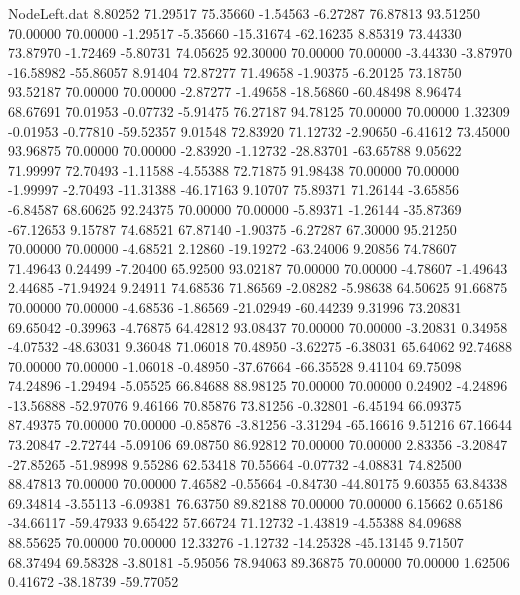 \begin{filecontents}{NodeLeft.dat}
   8.80252   71.29517   75.35660    -1.54563   -6.27287   76.87813   93.51250   70.00000   70.00000   -1.29517   -5.35660  -15.31674  -62.16235
   8.85319   73.44330   73.87970    -1.72469   -5.80731   74.05625   92.30000   70.00000   70.00000   -3.44330   -3.87970  -16.58982  -55.86057
   8.91404   72.87277   71.49658    -1.90375   -6.20125   73.18750   93.52187   70.00000   70.00000   -2.87277   -1.49658  -18.56860  -60.48498
   8.96474   68.67691   70.01953    -0.07732   -5.91475   76.27187   94.78125   70.00000   70.00000    1.32309   -0.01953   -0.77810  -59.52357
   9.01548   72.83920   71.12732    -2.90650   -6.41612   73.45000   93.96875   70.00000   70.00000   -2.83920   -1.12732  -28.83701  -63.65788
   9.05622   71.99997   72.70493    -1.11588   -4.55388   72.71875   91.98438   70.00000   70.00000   -1.99997   -2.70493  -11.31388  -46.17163
   9.10707   75.89371   71.26144    -3.65856   -6.84587   68.60625   92.24375   70.00000   70.00000   -5.89371   -1.26144  -35.87369  -67.12653
   9.15787   74.68521   67.87140    -1.90375   -6.27287   67.30000   95.21250   70.00000   70.00000   -4.68521    2.12860  -19.19272  -63.24006
   9.20856   74.78607   71.49643     0.24499   -7.20400   65.92500   93.02187   70.00000   70.00000   -4.78607   -1.49643    2.44685  -71.94924
   9.24911   74.68536   71.86569    -2.08282   -5.98638   64.50625   91.66875   70.00000   70.00000   -4.68536   -1.86569  -21.02949  -60.44239
   9.31996   73.20831   69.65042    -0.39963   -4.76875   64.42812   93.08437   70.00000   70.00000   -3.20831    0.34958   -4.07532  -48.63031
   9.36048   71.06018   70.48950    -3.62275   -6.38031   65.64062   92.74688   70.00000   70.00000   -1.06018   -0.48950  -37.67664  -66.35528
   9.41104   69.75098   74.24896    -1.29494   -5.05525   66.84688   88.98125   70.00000   70.00000    0.24902   -4.24896  -13.56888  -52.97076
   9.46166   70.85876   73.81256    -0.32801   -6.45194   66.09375   87.49375   70.00000   70.00000   -0.85876   -3.81256   -3.31294  -65.16616
   9.51216   67.16644   73.20847    -2.72744   -5.09106   69.08750   86.92812   70.00000   70.00000    2.83356   -3.20847  -27.85265  -51.98998
   9.55286   62.53418   70.55664    -0.07732   -4.08831   74.82500   88.47813   70.00000   70.00000    7.46582   -0.55664   -0.84730  -44.80175
   9.60355   63.84338   69.34814    -3.55113   -6.09381   76.63750   89.82188   70.00000   70.00000    6.15662    0.65186  -34.66117  -59.47933
   9.65422   57.66724   71.12732    -1.43819   -4.55388   84.09688   88.55625   70.00000   70.00000   12.33276   -1.12732  -14.25328  -45.13145
   9.71507   68.37494   69.58328    -3.80181   -5.95056   78.94063   89.36875   70.00000   70.00000    1.62506    0.41672  -38.18739  -59.77052

\end{filecontents}
